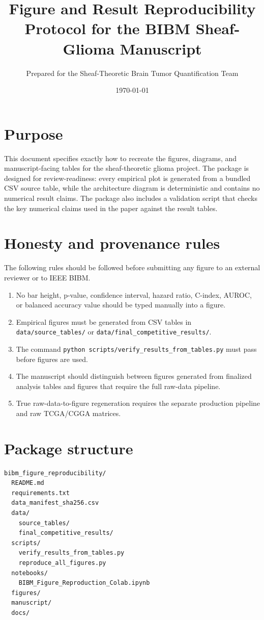 \documentclass[11pt]{article}
\title{Figure and Result Reproducibility Protocol for the BIBM Sheaf-Glioma Manuscript}
\author{Prepared for the Sheaf-Theoretic Brain Tumor Quantification Team}
\date{\today}
\begin{document}
\maketitle

\section{Purpose}
This document specifies exactly how to recreate the figures, diagrams, and manuscript-facing tables for the sheaf-theoretic glioma project. The package is designed for review-readiness: every empirical plot is generated from a bundled CSV source table, while the architecture diagram is deterministic and contains no numerical result claims. The package also includes a validation script that checks the key numerical claims used in the paper against the result tables.

\section{Honesty and provenance rules}
The following rules should be followed before submitting any figure to an external reviewer or to IEEE BIBM.
\begin{enumerate}[leftmargin=1.2cm]
  \item No bar height, p-value, confidence interval, hazard ratio, C-index, AUROC, or balanced accuracy value should be typed manually into a figure.
  \item Empirical figures must be generated from CSV tables in \texttt{data/source\_tables/} or \texttt{data/final\_competitive\_results/}.
  \item The command \texttt{python scripts/verify\_results\_from\_tables.py} must pass before figures are used.
  \item The manuscript should distinguish between figures generated from finalized analysis tables and figures that require the full raw-data pipeline.
  \item True raw-data-to-figure regeneration requires the separate production pipeline and raw TCGA/CGGA matrices.
\end{enumerate}

\section{Package structure}
\begin{lstlisting}
bibm_figure_reproducibility/
  README.md
  requirements.txt
  data_manifest_sha256.csv
  data/
    source_tables/
    final_competitive_results/
  scripts/
    verify_results_from_tables.py
    reproduce_all_figures.py
  notebooks/
    BIBM_Figure_Reproduction_Colab.ipynb
  figures/
  manuscript/
  docs/
\end{lstlisting}
\end{document}
